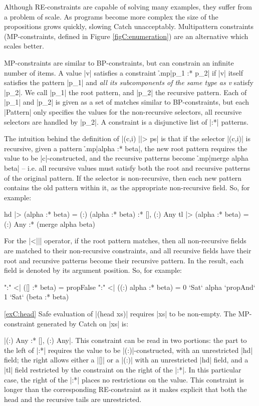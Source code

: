 Although RE-constraints are capable of solving many examples, they suffer from a problem of scale. As programs become more complex the size of the propositions grows quickly, slowing Catch unacceptably. Multipattern constraints (MP-constraints, defined in Figure \ref{figC:enumeration}) are an alternative which scales better.

MP-constraints are similar to BP-constraints, but can constrain an infinite number of items. A value |v| satisfies a constraint \h{.mp}|p_1 :* p_2| if |v| itself satisfies the pattern |p_1| and \textit{all its subcomponents of the same type as \textsf{v}} satisfy |p_2|. We call |p_1| the root pattern, and |p_2| the recursive pattern. Each of |p_1| and |p_2| is given as a set of matches similar to BP-constraints, but each |Pattern| only specifies the values for the non-recursive selectors, all recursive selectors are handled by |p_2|. A constraint is a disjunctive list of |:*| patterns.

The intuition behind the definition of |(c,i) ||> ps| is that if the selector |(c,i)| is recursive, given a pattern \h{.mp}|alpha :* beta|, the new root pattern requires the value to be |c|-constructed, and the recursive patterns become \h{.mp}|merge alpha beta| -- i.e. all recursive values must satisfy both the root and recursive patterns of the original pattern. If the selector is non-recursive, then each new pattern contains the old pattern within it, as the appropriate non-recursive field. So, for example:

\ignore\begin{code}
hd  |> (alpha :* beta) = {(:) (alpha :* beta)  } :* {[], (:) Any}
tl  |> (alpha :* beta) = {(:) Any              } :* (merge alpha beta)
\end{code}

For the |<||| operator, if the root pattern matches, then all non-recursive fields are matched to their non-recursive constraints, and all recursive fields have their root and recursive patterns become their recursive pattern. In the result, each field is denoted by its argument position. So, for example:

\ignore\begin{code}
":" <| ({[]         } :* beta) = propFalse
":" <| ({(:) alpha  } :* beta) = 0 `Sat` alpha `propAnd` 1 `Sat` (beta :* beta)
\end{code}

\begin{examplerevisit}{\ref{exC:head}} Safe evaluation of |(head xs)| requires |xs| to be non-empty. The MP-constraint generated by Catch on |xs| is: \ignore|{(:) Any} :* {[], (:) Any}|. This constraint can be read in two portions: the part to the left of |:*| requires the value to be |(:)|-constructed, with an unrestricted |hd| field; the right allows either a |[]| or a |(:)| with an unrestricted |hd| field, and a |tl| field restricted by the constraint on the right of the |:*|. In this particular case, the right of the |:*| places no restrictions on the value. This constraint is longer than the corresponding RE-constraint as it makes explicit that both the head and the recursive tails are unrestricted.
\end{examplerevisit}

